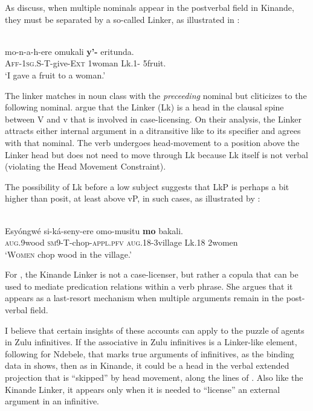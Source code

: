 \documentclass[output=paper,colorlinks,citecolor=brown]{langscibook}
\begin{document}
As \citet{BakerCollins2006} discuss, when multiple nominals appear in the postverbal field in Kinande, they must be separated by a so-called Linker, as illustrated in :

\ea%
    \label{ex:halpert:19}
    \\
    \gll    mo-n-a-h-ere omukali \textbf{y'-} eritunda.\\
            \textsc{Aff-1sg.S-T-}give-\textsc{Ext} 1woman Lk.1- 5fruit.\\
    \glt    `I gave a fruit to a woman.' %
\z 

The linker matches in noun class with the \textit{preceeding} nominal but cliticizes to the following nominal. \citet{BakerCollins2006} argue that the Linker (Lk) is a head in the clausal spine between V and v that is involved in case-licensing.  On their analysis, the Linker attracts either internal argument in a ditransitive like  to its specifier and agrees with that nominal.  The verb undergoes head-movement to a position above the Linker head but does not need to move through Lk  because Lk itself is not verbal (violating the Head Movement Constraint).

The possibility of Lk before a low subject suggests that LkP is perhaps a bit higher than \citet{BakerCollins2006} posit, at least above vP, in such cases, as illustrated by :

\ea%
    \label{ex:halpert:20}
    \\
    \gll    Esy\'ongw\'e si-k\'a-seny-ere omo-musitu \textbf{mo} bakali.\\
            \textsc{aug}.9wood \textsc{sm}9-T-chop-\textsc{appl.pfv} \textsc{aug}.18-3village Lk.18 2women\\
    \glt    `\textsc{Women} chop wood in the village.' 
\z 

For \citet{Schneider-Zioga2015ACAL, Schneider-Zioga2015WCCFL}, the Kinande Linker is not a case-licenser, but rather a copula that can be used to mediate predication relations within a verb phrase.  She argues that it appears as a last-resort mechanism when multiple arguments remain in the post-verbal field.  

I believe that certain insights of these accounts can apply to the puzzle of agents in Zulu infinitives.  If the associative in Zulu infinitives is a Linker-like element, following \citet{Pietraszko2019} for Ndebele, that marks true arguments of infinitives, as the binding data in  shows, then as in Kinande, it could be a head in the verbal extended projection that is ``skipped'' by head movement, along the lines of \citet{BakerCollins2006}. Also like the Kinande Linker, it appears only when it is needed to ``license'' an external argument in an infinitive.
\end{document}

